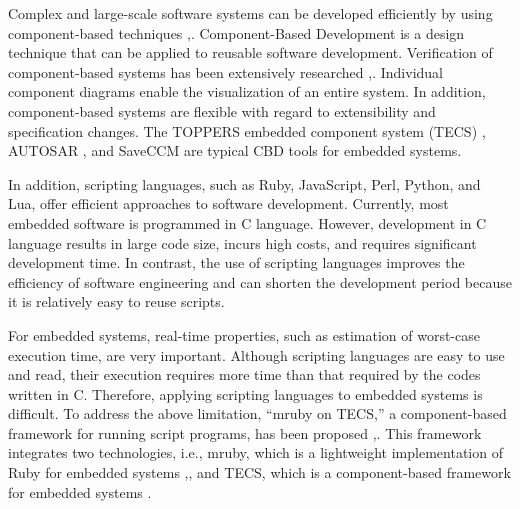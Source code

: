 \documentclass[a4j,12pt,oneside,openany,english]{jsbook}
\begin{document}
Complex and large-scale software systems can be developed efficiently by using component-based techniques \cite{par:Crnkovic},\cite{par:CBD}.
Component-Based Development is a design technique that can be applied to reusable software development.
Verification of component-based systems has been extensively researched \cite{par:Blaming},\cite{par:Verification}.
Individual component diagrams enable the visualization of an entire system.
In addition, component-based systems are flexible with regard to extensibility and specification changes.
The TOPPERS embedded component system (TECS) \cite{par:TECS}, AUTOSAR \cite{url:AUTOSAR}, and SaveCCM \cite{par:SAVEapproach} are typical CBD tools for embedded systems.

In addition, scripting languages, such as Ruby, JavaScript, Perl, Python, and Lua, offer efficient approaches to software development.
Currently, most embedded software is programmed in C language.
However, development in C language results in large code size, incurs high costs, and requires significant development time.
In contrast, the use of scripting languages improves the efficiency of software engineering and can shorten the development period because it is relatively easy to reuse scripts. 

For embedded systems, real-time properties, such as estimation of worst-case execution time, are very important.
Although scripting languages are easy to use and read, their execution requires more time than that required by the codes written in C.
Therefore, applying scripting languages to embedded systems is difficult.
To address the above limitation, ``mruby on TECS,'' a component-based framework for running script programs, has been proposed \cite{par:mrubyonTECS},\cite{par:mrubyonTECS3}.
This framework integrates two technologies, i.e., mruby, which is a lightweight implementation of Ruby for embedded systems \cite{par:mruby},\cite{url:mruby}, and TECS, which is a component-based framework for embedded systems \cite{par:TECS}.
\end{document}
